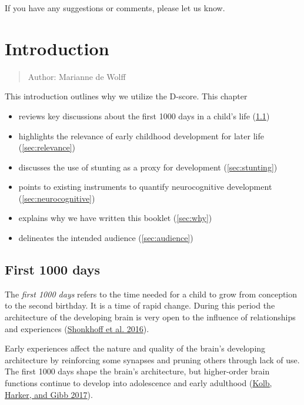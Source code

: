 \documentclass[
]{book}
\providecommand{\tightlist}{%
  \setlength{\itemsep}{0pt}\setlength{\parskip}{0pt}}
\begin{document}
If you have any suggestions or comments, please let us know.

\hypertarget{intro}{%
\chapter{Introduction}\label{intro}}

\begin{quote}
Author: Marianne de Wolff
\end{quote}

This introduction outlines why we utilize the D-score. This chapter

\begin{itemize}
\tightlist
\item
  reviews key discussions about the first 1000 days in a child's life (\ref{sec:first1000})
\item
  highlights the relevance of early childhood development for later life (\ref{sec:relevance})
\item
  discusses the use of stunting as a proxy for development (\ref{sec:stunting})
\item
  points to existing instruments to quantify neurocognitive development (\ref{sec:neurocognitive})
\item
  explains why we have written this booklet (\ref{sec:why})
\item
  delineates the intended audience (\ref{sec:audience})
\end{itemize}

\hypertarget{sec:first1000}{%
\section{First 1000 days}\label{sec:first1000}}

The \emph{first 1000 days} refers to the time needed for a child to grow from conception to the second birthday. It is a time of rapid change. During this period the architecture of the developing brain is very open to the influence of relationships and experiences (\protect\hyperlink{ref-skonkhoff2016best}{Shonkhoff et al. 2016}).

Early experiences affect the nature and quality of the brain's developing architecture by reinforcing some synapses and pruning others through lack of use. The first 1000 days shape the brain's architecture, but higher-order brain functions continue to develop into adolescence and early adulthood (\protect\hyperlink{ref-kolb2017principles}{Kolb, Harker, and Gibb 2017}).
\end{document}
